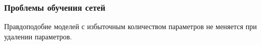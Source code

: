 \documentclass[11pt,pdf,utf8,russian,aspectratio=169]{beamer}
\begin{document}
\begin{frame}                                                                                                                                   
\frametitle{Проблемы обучения сетей}                                                                                                            
Правдоподобие моделей с избыточным количеством параметров не меняется при удалении параметров.                                                       
\begin{figure}[h]                                                                                                                               
\centering                                                                                                                                      
\end{figure}                                                                                                                                    
                                                                                                                                                
\end{frame}    
\end{document}
